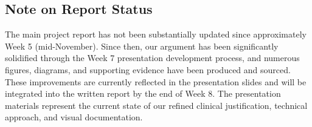 \subsection*{Note on Report Status}

The main project report has not been substantially updated since approximately Week 5 (mid-November). Since then, our argument has been significantly solidified through the Week 7 presentation development process, and numerous figures, diagrams, and supporting evidence have been produced and sourced. These improvements are currently reflected in the presentation slides and will be integrated into the written report by the end of Week 8. The presentation materials represent the current state of our refined clinical justification, technical approach, and visual documentation.
